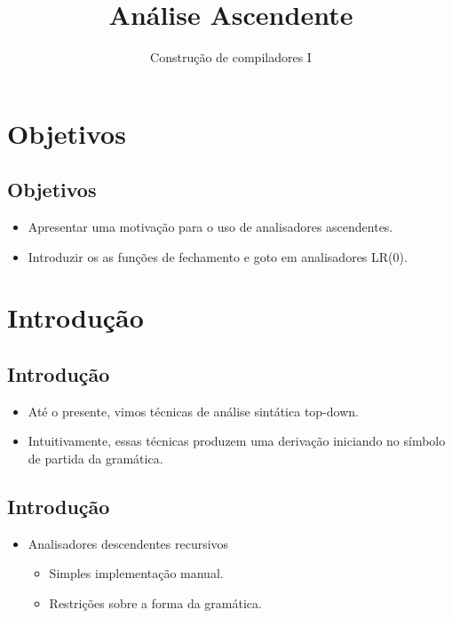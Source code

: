 \documentclass[11pt]{article}
\author{Construção de compiladores I}
\date{}
\title{Análise Ascendente}
\begin{document}
\maketitle
\section*{Objetivos}
\label{sec:org846d29b}

\subsection*{Objetivos}
\label{sec:orgeae88ac}

\begin{itemize}
\item Apresentar uma motivação para o uso de analisadores ascendentes.

\item Introduzir os as funções de fechamento e goto em analisadores LR(0).
\end{itemize}
\section*{Introdução}
\label{sec:orgad79db8}

\subsection*{Introdução}
\label{sec:orgb901c23}

\begin{itemize}
\item Até o presente, vimos técnicas de análise sintática top-down.

\item Intuitivamente, essas técnicas produzem uma derivação iniciando no
símbolo de partida da gramática.
\end{itemize}
\subsection*{Introdução}
\label{sec:org34cf22e}

\begin{itemize}
\item Analisadores descendentes recursivos
\begin{itemize}
\item Simples implementação manual.
\item Restrições sobre a forma da gramática.
\end{itemize}
\end{itemize}
\end{document}
